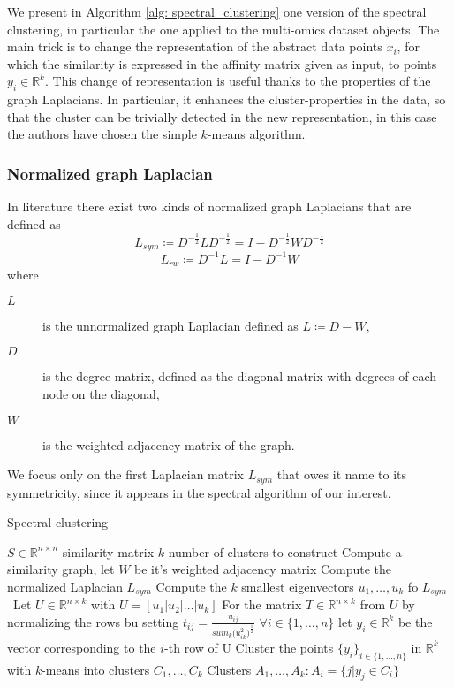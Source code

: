 We present in Algorithm \ref{alg: spectral_clustering} one version of the spectral clustering, in particular the one applied to the multi-omics dataset objects. The main trick is to change the representation of the abstract data points $x_i$, for which the similarity is expressed in the affinity matrix given as input, to points $y_i\in\mathbb{R}^k$. This change of representation is useful thanks to the properties of the graph Laplacians. In particular, it enhances the cluster-properties in the data, so that the cluster can be trivially detected in the new representation, in this case the authors have chosen the simple $k$-means algorithm\cite{Hastie2009ElementsStatisticalLearning}.
\subsubsection*{Normalized graph Laplacian}
In literature there exist two kinds of normalized graph Laplacians\cite{chung1997SpectralGraphTheory} that are defined as 
\begin{equation*}
    L_{sym}\coloneqq D^{-\frac{1}{2}}LD^{-\frac{1}{2}}=I-D^{-\frac{1}{2}}WD^{-\frac{1}{2}}
\end{equation*}
\begin{equation*}
    L_{rw}\coloneqq D^{-1}L=I-D^{-1}W
\end{equation*}
where
\begin{description}
    \item[$L$] is the unnormalized graph Laplacian defined as $L\coloneqq D-W$,
    \item[$D$] is the degree matrix, defined as the diagonal matrix with degrees of each node on the diagonal,
    \item[$W$] is the weighted adjacency matrix of the graph.    
\end{description}

We focus only on the first Laplacian matrix $L_{sym}$ that owes it name to its symmetricity, since it appears in the spectral algorithm of our interest.
\begin{algorithm}
    \caption{Spectral clustering}
    \label{alg: spectral_clustering}
    \begin{algorithmic}
        \Input
        \State $S\in \mathbb{R}^{n\times n}$ similarity matrix
        \State $k$ number of clusters to construct
        \EndInput
        \State
        \State Compute a similarity graph, let $W$ be it's weighted adjacency matrix
        \State Compute the normalized Laplacian $L_{sym}$
        \State Compute the $k$ smallest eigenvectors $u_1,\dots,u_k$ fo $L_{sym}$\
        \State Let $U\in \mathbb{R}^{n\times k}$ with $U=\left[u_1|u_2|\dots|u_k\right]$
        \State For the matrix $T\in\mathbb{R}^{n\times k}$ from $U$ by normalizing the rows bu setting $t_{ij}=\frac{u_{ij}}{sum_k{(u^2_{ik}})^\frac{1}{2}}$
        \State $\forall i \in \{1,\dots,n\}$ let $y_i\in \mathbb{R}^k$ be the vector corresponding to the $i$-th row of U
        \State Cluster the points $\{y_i\}_{i\in\{1,\dots,n\}}$ in $\mathbb{R}^k$ with $k$-means into clusters $C_1,\dots,C_k$
        \State
        \Output
        \State Clusters $A_1,\dots,A_k: A_i=\{j|y_j\in C_i\}$
        \EndOutput
    \end{algorithmic}
\end{algorithm}